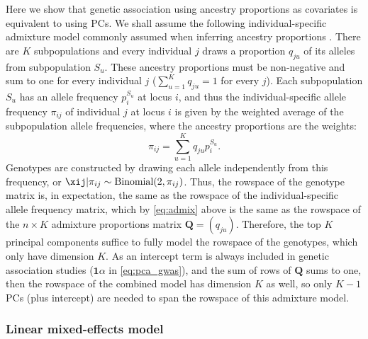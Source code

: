 \documentclass[11pt]{article}
\begin{document}
Here we show that genetic association using ancestry proportions as covariates is equivalent to using PCs.
We shall assume the following individual-specific admixture model commonly assumed when inferring ancestry proportions \citep{pritchard_inference_2000, falush_inference_2003, alexander_fast_2009, gopalan_scaling_2016, cabreros_likelihood-free_2019}.
There are $K$ subpopulations and every individual $j$ draws a proportion $q_{ju}$ of its alleles from subpopulation $S_u$.
These ancestry proportions must be non-negative and sum to one for every individual $j$ ($\sum_{u=1}^K q_{ju} = 1$ for every $j$).
Each subpopulation $S_u$ has an allele frequency $p_i^{S_u}$ at locus $i$, and thus the individual-specific allele frequency $\pi_{ij}$ of individual $j$ at locus $i$ is given by the weighted average of the subpopulation allele frequencies, where the ancestry proportions are the weights:
\begin{equation}
  \label{eq:admix}
  \pi_{ij} = \sum_{u=1}^K q_{ju} p_i^{S_u}.
\end{equation}
Genotypes are constructed by drawing each allele independently from this frequency, or $\xij | \pi_{ij} \sim \text{Binomial}(2, \pi_{ij})$.
Thus, the rowspace of the genotype matrix is, in expectation, the same as the rowspace of the individual-specific allele frequency matrix, which by \cref{eq:admix} above is the same as the rowspace of the $n \times K$ admixture proportions matrix $\mathbf{Q} = (q_{ju})$.
Therefore, the top $K$ principal components suffice to fully model the rowspace of the genotypes, which only have dimension $K$.
As an intercept term is always included in genetic association studies ($\mathbf{1} \alpha$ in \cref{eq:pca_gwas}), and the sum of rows of $\mathbf{Q}$ sums to one, then the rowspace of the combined model has dimension $K$ as well, so only $K-1$ PCs (plus intercept) are needed to span the rowspace of this admixture model.

\subsubsection{Linear mixed-effects model}
\end{document}
